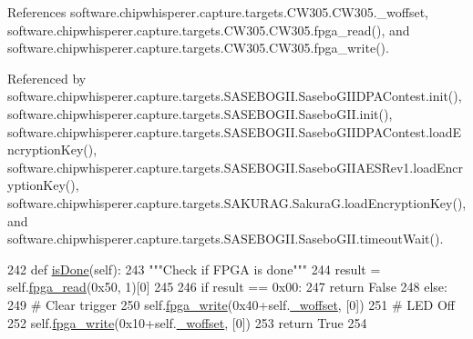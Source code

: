 References software.\+chipwhisperer.\+capture.\+targets.\+C\+W305.\+C\+W305.\+\_\+woffset, software.\+chipwhisperer.\+capture.\+targets.\+C\+W305.\+C\+W305.\+fpga\+\_\+read(), and software.\+chipwhisperer.\+capture.\+targets.\+C\+W305.\+C\+W305.\+fpga\+\_\+write().



Referenced by software.\+chipwhisperer.\+capture.\+targets.\+S\+A\+S\+E\+B\+O\+G\+I\+I.\+Sasebo\+G\+I\+I\+D\+P\+A\+Contest.\+init(), software.\+chipwhisperer.\+capture.\+targets.\+S\+A\+S\+E\+B\+O\+G\+I\+I.\+Sasebo\+G\+I\+I.\+init(), software.\+chipwhisperer.\+capture.\+targets.\+S\+A\+S\+E\+B\+O\+G\+I\+I.\+Sasebo\+G\+I\+I\+D\+P\+A\+Contest.\+load\+Encryption\+Key(), software.\+chipwhisperer.\+capture.\+targets.\+S\+A\+S\+E\+B\+O\+G\+I\+I.\+Sasebo\+G\+I\+I\+A\+E\+S\+Rev1.\+load\+Encryption\+Key(), software.\+chipwhisperer.\+capture.\+targets.\+S\+A\+K\+U\+R\+A\+G.\+Sakura\+G.\+load\+Encryption\+Key(), and software.\+chipwhisperer.\+capture.\+targets.\+S\+A\+S\+E\+B\+O\+G\+I\+I.\+Sasebo\+G\+I\+I.\+timeout\+Wait().


\begin{DoxyCode}
242     \textcolor{keyword}{def }\hyperlink{classsoftware_1_1chipwhisperer_1_1capture_1_1targets_1_1CW305_1_1CW305_ac963ac59697b3fe9527ec5052a0a78a5}{isDone}(self):
243         \textcolor{stringliteral}{"""Check if FPGA is done"""}
244         result = self.\hyperlink{classsoftware_1_1chipwhisperer_1_1capture_1_1targets_1_1CW305_1_1CW305_af9987c39ac92c606f57a7f855bec6370}{fpga\_read}(0x50, 1)[0]
245 
246         \textcolor{keywordflow}{if} result == 0x00:
247             \textcolor{keywordflow}{return} \textcolor{keyword}{False}
248         \textcolor{keywordflow}{else}:
249             \textcolor{comment}{# Clear trigger}
250             self.\hyperlink{classsoftware_1_1chipwhisperer_1_1capture_1_1targets_1_1CW305_1_1CW305_ae03b33dbb86ffd11d1e2a245cd1575d4}{fpga\_write}(0x40+self.\hyperlink{classsoftware_1_1chipwhisperer_1_1capture_1_1targets_1_1CW305_1_1CW305_ae3b3c06e79a18778f84b7a6394b206b2}{\_woffset}, [0])
251             \textcolor{comment}{# LED Off}
252             self.\hyperlink{classsoftware_1_1chipwhisperer_1_1capture_1_1targets_1_1CW305_1_1CW305_ae03b33dbb86ffd11d1e2a245cd1575d4}{fpga\_write}(0x10+self.\hyperlink{classsoftware_1_1chipwhisperer_1_1capture_1_1targets_1_1CW305_1_1CW305_ae3b3c06e79a18778f84b7a6394b206b2}{\_woffset}, [0])
253             \textcolor{keywordflow}{return} \textcolor{keyword}{True}
254         
\end{DoxyCode}
\hypertarget{classsoftware_1_1chipwhisperer_1_1capture_1_1targets_1_1CW305_1_1CW305_a0d657e30e87967e9546ce7bd5170c3a3}{}
